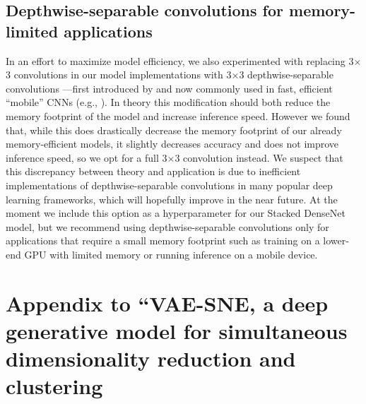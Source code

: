 \documentclass[11pt,a4paper,oneside]{book}
\begin{document}
\begin{appendices}
\section{Depthwise-separable convolutions for memory-limited applications}
In an effort to maximize model efficiency, we also experimented with replacing 3$\times$3 convolutions in our model implementations with 3$\times$3 depthwise-separable convolutions —first introduced by \cite{chollet2017xception} and now commonly used in fast, efficient “mobile” CNNs (e.g., \citealt{sandler2018mobilenetv2}). In theory this modification should both reduce the memory footprint of the model and increase inference speed. However we found that, while this does drastically decrease the memory footprint of our already memory-efficient models, it slightly decreases accuracy and does not improve inference speed, so we opt for a full 3$\times$3 convolution instead. We suspect that this discrepancy between theory and application is due to inefficient implementations of depthwise-separable convolutions in many popular deep learning frameworks, which will hopefully improve in the near future. At the moment we include this option as a hyperparameter for our Stacked DenseNet model, but we recommend using depthwise-separable convolutions only for applications that require a small memory footprint such as training on a lower-end GPU with limited memory or running inference on a mobile device.

\chapter[VAE-SNE]{Appendix to ``VAE-SNE, a deep generative model for simultaneous dimensionality reduction and clustering}


\end{appendices}
\end{document}
